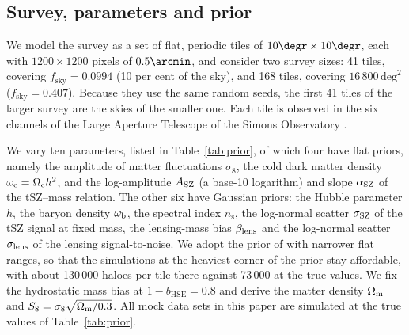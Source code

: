 \subsection{Survey, parameters and prior}\label{sec:sims:survey}

We model the survey as a set of flat, periodic tiles of $10\degr\times10\degr$, each with $1200\times1200$
pixels of $0.5\arcmin$, and consider two survey sizes: 41 tiles, covering $f_\mathrm{sky}=0.0994$ (10 per
cent of the sky), and 168 tiles, covering $16\,800\,\mathrm{deg}^2$ ($f_\mathrm{sky}=0.407$). Because they
use the same random seeds, the first 41 tiles of the larger survey are the skies of the smaller one. Each
tile is observed in the six channels of the Large Aperture Telescope of the Simons Observatory
\citep[SO;][]{SO2019}.

We vary ten parameters, listed in Table~\ref{tab:prior}, of which four have flat priors, namely the
amplitude of matter fluctuations $\sigma_8$, the cold dark matter density $\omega_\mathrm{c}=\Omega_\mathrm{c} h^2$, and
the log-amplitude $A_\mathrm{SZ}$ (a base-10 logarithm) and slope $\alpha_\mathrm{SZ}$ of the tSZ--mass relation. The other six
have Gaussian priors: the Hubble parameter $h$, the baryon density $\omega_\mathrm{b}$, the spectral index
$n_\mathrm{s}$, the log-normal scatter $\sigma_\mathrm{SZ}$ of the tSZ signal at fixed mass, the lensing-mass bias
$\beta_\mathrm{lens}$ and the log-normal scatter $\sigma_\mathrm{lens}$ of the lensing signal-to-noise. We adopt the prior of
\citet{Zubeldia2025} with narrower flat ranges, so that the simulations at the heaviest corner of the prior
stay affordable, with about 130\,000 haloes per tile there against 73\,000 at the true values. We fix the
hydrostatic mass bias at $1-b_\mathrm{HSE}=0.8$ and derive the matter density $\Omega_\mathrm{m}$ and
$S_8=\sigma_8\sqrt{\Omega_\mathrm{m}/0.3}$. All mock data sets in this paper are simulated at the true values of
Table~\ref{tab:prior}.


